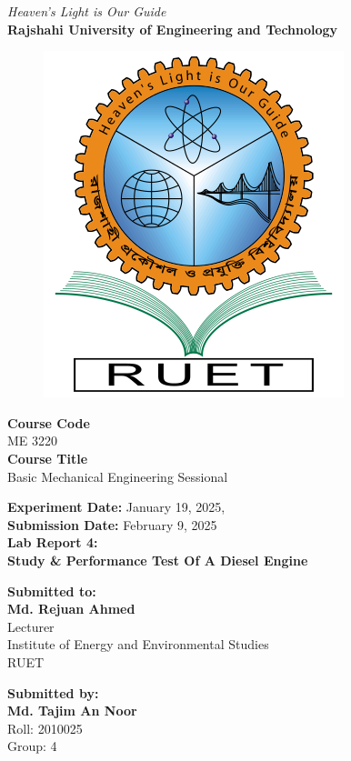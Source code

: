 \vspace*{\fill}
\begin{center}

    \emph{Heaven's Light is Our Guide} \\
    \textbf{Rajshahi University of Engineering and Technology} \\

    \begin{figure}[H]
        \centering
        \includegraphics[scale=.34]{images/RUET_logo.png}
        \label{fig:ruet_logo}
    \end{figure}
    \vspace{5mm}

    \textbf{Course Code}\\
    ME 3220\\
    \vspace{3mm}
    \textbf{Course Title}\\
    Basic Mechanical Engineering Sessional

    \vspace{5mm}
    \textbf{Experiment Date:} {January 19, 2025},\\
    \textbf{Submission Date:} {February 9, 2025}\\

    \vspace{5mm}
    \textbf{Lab Report 4: \\
        Study \& Performance Test Of A Diesel Engine}

    \vspace{10mm}

    \textbf{Submitted to:} \\
    \textbf{Md. Rejuan Ahmed} \\
    Lecturer \\
    Institute of Energy and Environmental Studies \\
    RUET
    \vspace{8mm}

    \textbf{Submitted by:} \\
    \textbf{Md. Tajim An Noor} \\
    Roll: 2010025\\
    Group: 4

\end{center}
\vspace*{\fill}
